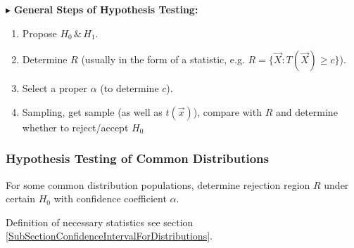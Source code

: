 \documentclass[11pt,a4paper]{ctexart}
\numberwithin{equation}{section}%
\newenvironment{point}{\raggedright$\blacktriangleright$}{}%
\begin{document}
        \begin{point}
            \textbf{General Steps of Hypothesis Testing:}
        \end{point}
        
        

        \begin{enumerate}[topsep=0pt]
            \item Propose $H_0\,\&\, H_1$.
            \item Determine $R$ (usually in the form of a statistic, e.g. $R=\{\vec{X}:T(\vec{X})\geq c\}$).
            \item Select a proper $\alpha$ (to determine $c$).
            \item Sampling, get sample (as well as $t(\vec{x})$), compare with $R$ and determine whether to reject/accept $H_0$
        \end{enumerate}

        



\subsubsection{Hypothesis Testing of Common Distributions}\label{SubSectionHypothesisTestingOfCommonDistributions}
    For some common distribution populations, determine rejection region $R$ under certain $H_0$ with confidence coefficient $\alpha$.

    Definition of necessary statistics see section \hyperref[SubSectionConfidenceIntervalForDistributions]{\ref{SubSectionConfidenceIntervalForDistributions}}.
\end{document}
